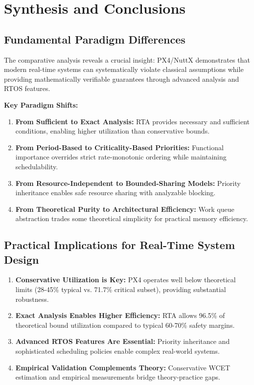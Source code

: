 \documentclass[12pt,a4paper]{article}
\begin{document}
\section{Synthesis and Conclusions}

\subsection{Fundamental Paradigm Differences}

The comparative analysis reveals a crucial insight: PX4/NuttX demonstrates that modern real-time systems can systematically violate classical assumptions while providing mathematically verifiable guarantees through advanced analysis and RTOS features.

\textbf{Key Paradigm Shifts:}
\begin{enumerate}
\item \textbf{From Sufficient to Exact Analysis:} RTA provides necessary and sufficient conditions, enabling higher utilization than conservative bounds.

\item \textbf{From Period-Based to Criticality-Based Priorities:} Functional importance overrides strict rate-monotonic ordering while maintaining schedulability.

\item \textbf{From Resource-Independent to Bounded-Sharing Models:} Priority inheritance enables safe resource sharing with analyzable blocking.

\item \textbf{From Theoretical Purity to Architectural Efficiency:} Work queue abstraction trades some theoretical simplicity for practical memory efficiency.
\end{enumerate}

\subsection{Practical Implications for Real-Time System Design}

\begin{enumerate}
\item \textbf{Conservative Utilization is Key:} PX4 operates well below theoretical limits (28-45\% typical vs. 71.7\% critical subset), providing substantial robustness.

\item \textbf{Exact Analysis Enables Higher Efficiency:} RTA allows 96.5\% of theoretical bound utilization compared to typical 60-70\% safety margins.

\item \textbf{Advanced RTOS Features Are Essential:} Priority inheritance and sophisticated scheduling policies enable complex real-world systems.

\item \textbf{Empirical Validation Complements Theory:} Conservative WCET estimation and empirical measurements bridge theory-practice gaps.
\end{enumerate}
\end{document}
